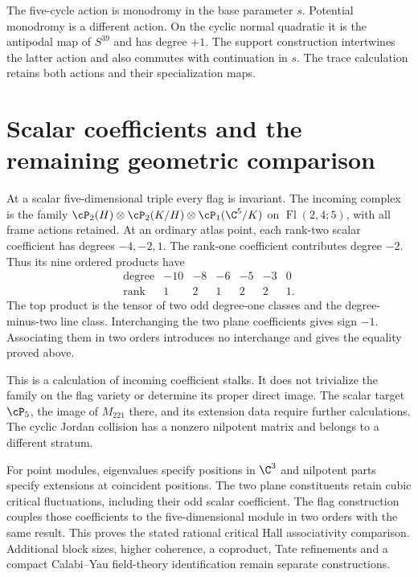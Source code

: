 The five-cycle action is monodromy in the base parameter $s$.
Potential monodromy is a different action. On the cyclic normal
quadratic it is the antipodal map of $S^{39}$ and has degree $+1$.
The support construction intertwines the latter action and also
commutes with continuation in $s$. The trace calculation retains
both actions and their specialization maps.

\section{Scalar coefficients and the remaining geometric comparison}
\label{fl221:sec:scalar}

At a scalar five-dimensional triple every flag is invariant.
The incoming complex is the family
$\cP_2(H)\otimes\cP_2(K/H)\otimes\cP_1(\C^5/K)$
on $\operatorname{Fl}(2,4;5)$, with all frame actions retained.
At an ordinary atlas point, each rank-two scalar coefficient has
degrees $-4,-2,1$. The rank-one coefficient contributes degree
$-2$. Thus its nine ordered products have
\[
\begin{array}{c|rrrrrr}
 \text{degree}&-10&-8&-6&-5&-3&0\\\hline
 \text{rank}&1&2&1&2&2&1.
\end{array}
\]
The top product is the tensor of two odd degree-one classes and
the degree-minus-two line class. Interchanging the two plane
coefficients gives sign $-1$. Associating them in two orders
introduces no interchange and gives the equality proved above.

This is a calculation of incoming coefficient stalks. It does not
trivialize the family on the flag variety or determine its proper
direct image. The scalar target $\cP_5$, the image of $M_{221}$
there, and its extension data require further calculations.
The cyclic Jordan collision has a nonzero nilpotent matrix and
belongs to a different stratum.

For point modules, eigenvalues specify positions in $\C^3$ and
nilpotent parts specify extensions at coincident positions.
The two plane constituents retain cubic critical fluctuations,
including their odd scalar coefficient. The flag construction
couples those coefficients to the five-dimensional module in two
orders with the same result. This proves the stated rational
critical Hall associativity comparison. Additional block sizes,
higher coherence, a coproduct, Tate refinements and a compact
Calabi--Yau field-theory identification remain separate constructions.
